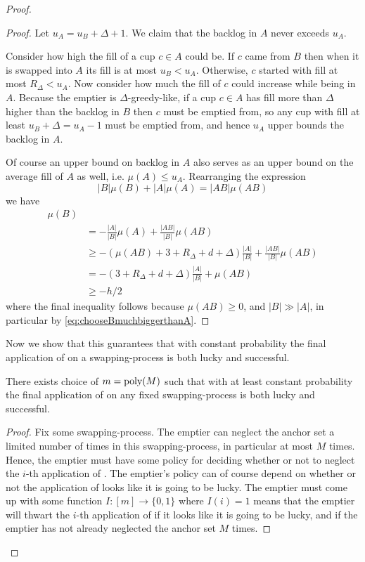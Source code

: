 \begin{proof}
\begin{proof}
  Let $u_A = u_B + \Delta + 1$. We claim that the backlog in $A$
  never exceeds $u_A$.

  Consider how high the fill of a cup $c \in A$ could be.
  If $c$ came from $B$ then when it is swapped
  into $A$ its fill is at most $u_B < u_A$. Otherwise, $c$
  started with fill at most $R_\Delta < u_A$. Now consider how
  much the fill of $c$ could increase while being in $A$. Because
  the emptier is $\Delta$-greedy-like, if a cup $c\in A$ has fill
  more than $\Delta$ higher than the backlog in $B$ then $c$ must
  be emptied from, so any cup with fill at least $u_B + \Delta =
  u_A - 1$ must be emptied from, and hence $u_A$ upper bounds the
  backlog in $A$. 

  Of course an upper bound on backlog in $A$ also serves as
  an upper bound on the average fill of $A$ as well, i.e.
  $\mu(A) \le u_A$. 
  Rearranging the expression 
  $$|B|\mu(B) + |A|\mu(A) = |AB|\mu(AB)$$
  we have
  \begin{align*}
    \mu(B) &\\
           &= -\frac{|A|}{|B|} \mu(A) + \frac{|A B|}{|B|}\mu(A B) \\
           &\ge -(\mu(AB) + 3+R_\Delta+d+\Delta) \frac{|A|}{|B|} + \frac{|AB|}{|B|}\mu(AB)\\
           &= -(3+R_\Delta+d + \Delta) \frac{|A|}{|B|} + \mu(AB)\\
           &\ge -h/2
  \end{align*}
  where the final inequality follows because $\mu(AB) \ge 0$, and
  $|B|\gg |A|$, in particular by \eqref{eq:chooseBmuchbiggerthanA}.

\end{proof}

Now we show that this guarantees that with constant probability
the final application of \randalg on a swapping-process is both
lucky and successful. 
\begin{clm}
  \label{clm:existsMsuchthatSwapHasConstantPrOfSuccess}
  There exists choice of $m = \operatorname{\text{poly}}(M)$ such that with at least
  constant probability the final application of \randalg on any
  fixed swapping-process is both lucky and successful.
\end{clm}
\begin{proof}
  Fix some swapping-process.
  The emptier can neglect the anchor set a limited number of
  times in this swapping-process, in particular at most $M$
  times. Hence, the emptier must have some policy for deciding
  whether or not to neglect the $i$-th application of \randalg.
  The emptier's policy can of course depend on whether or not the
  application of \randalg looks like it is going to be lucky.
  The emptier must come up with some function $I: [m] \to
  \{0,1\}$ where $I(i)=1$ means that the emptier will thwart the
  $i$-th application of \randalg if it looks like it is going to
  be lucky, and if the emptier has not already neglected the
  anchor set $M$ times.


\end{proof}
\end{proof}
